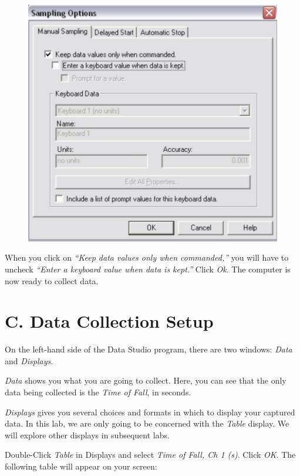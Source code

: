 \begin{figure}[h!]
  \centerline{\includegraphics[scale=0.475]{resources/photo5.jpg}}
\end{figure}

  When you click on \emph{“Keep data values only when commanded,”} you will have 
to uncheck \emph{“Enter a keyboard value when data is kept.”} Click \emph{Ok}. The computer 
is now ready to collect data.

\newpage

\section{C. Data Collection Setup}

On the left-hand side of the Data Studio program, there are two windows: \emph{Data}
and \emph{Displays}. 

\emph{Data} shows you what you are going to collect. Here, you can see that the only 
data being collected is the \emph{Time of Fall}, in seconds.

\emph{Displays} gives you several choices and formats in which to display your captured 
data. In this lab, we are only going to be concerned with the \emph{Table} display.
We will explore other displays in subsequent labs.

Double-Click \emph{Table} in Displays and select \emph{Time of Fall, Ch 1 (s)}. Click \emph{OK}. 
The following table will appear on your screen:


